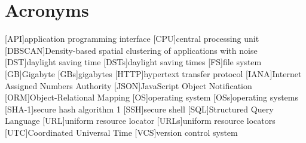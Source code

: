 \chapter*{Acronyms}
\begin{acronym}
    [API]{application programming interface}
    [CPU]{central processing unit}
    [DBSCAN]{Density-based spatial clustering of applications with noise}
    [DST]{daylight saving time}
    [DSTs]{daylight saving times}
    [FS]{file system}
    [GB]{Gigabyte}
    [GBs]{gigabytes}
    [HTTP]{hypertext transfer protocol}
    [IANA]{Internet Assigned Numbers Authority}
    [JSON]{JavaScript Object Notification}
    [ORM]{Object-Relational Mapping}
    [OS]{operating system}
    [OSs]{operating systems}
    [SHA-1]{secure hash algorithm 1}
    [SSH]{secure shell}
    [SQL]{Structured Query Language}
    [URL]{uniform resource locator}
    [URLs]{uniform resource locators}
    [UTC]{Coordinated Universal Time}
    [VCS]{version control system}
\end{acronym}
